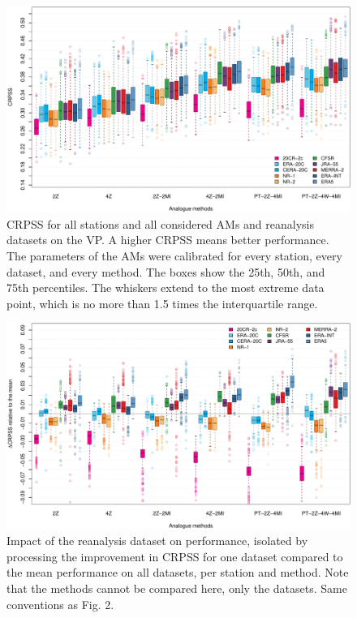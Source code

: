 \documentclass[alpha-refs]{wiley-article}
\begin{document}
\begin{figure}[bt]
	\centering
	\includegraphics[width=\textwidth]{figures/boxplot-per-method.pdf}
	\caption{CRPSS for all stations and all considered AMs and reanalysis datasets on the VP. A higher CRPSS means better performance. The parameters of the AMs were calibrated for every station, every dataset, and every method. The boxes show the 25th, 50th, and 75th percentiles. The whiskers extend to the most extreme data point, which is no more than 1.5 times the interquartile range.}
	\label{fig:comparison_values}
\end{figure}

\begin{figure}[bt]
	\centering
	\includegraphics[width=\textwidth]{figures/boxplot-per-method-diff.pdf}
	\caption{Impact of the reanalysis dataset on performance, isolated by processing the improvement in CRPSS for one dataset compared to the mean performance on all datasets, per station and method. Note that the methods cannot be compared here, only the datasets. Same conventions as Fig. 2.}
	\label{fig:comparison_relative}
\end{figure}
\end{document}
